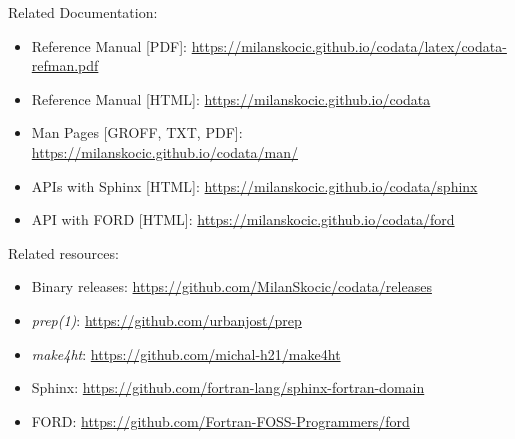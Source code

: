 \vspace{1cm}

\noindent Related Documentation:
\begin{itemize}
\item Reference Manual [PDF]:          \url{https://milanskocic.github.io/codata/latex/codata-refman.pdf}
\item Reference Manual [HTML]:         \url{https://milanskocic.github.io/codata}
\item Man Pages [GROFF, TXT, PDF]:     \url{https://milanskocic.github.io/codata/man/}
\item APIs with Sphinx [HTML]:         \url{https://milanskocic.github.io/codata/sphinx}
\item API with FORD    [HTML]:         \url{https://milanskocic.github.io/codata/ford}
\end{itemize}


\noindent Related resources:
\begin{itemize}
\item Binary releases:  \url{https://github.com/MilanSkocic/codata/releases}
\item \emph{prep(1)}:   \url{https://github.com/urbanjost/prep}
\item \emph{make4ht}:   \url{https://github.com/michal-h21/make4ht}
\item Sphinx:           \url{https://github.com/fortran-lang/sphinx-fortran-domain}
\item FORD:             \url{https://github.com/Fortran-FOSS-Programmers/ford}
\end{itemize}
